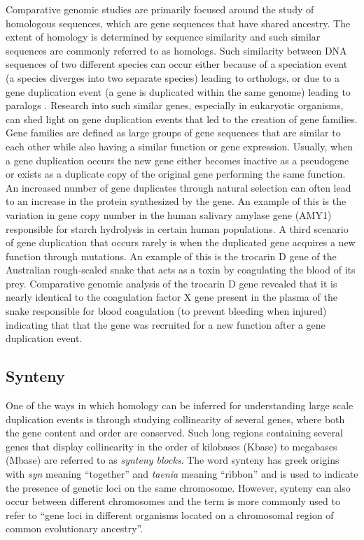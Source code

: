 Comparative genomic studies are primarily focused around the study of homologous sequences, which are gene sequences that have shared ancestry. The extent of homology is determined by sequence similarity and such similar sequences are commonly referred to as homologs. Such similarity between DNA sequences of two different species can occur either because of a speciation event (a species diverges into two separate species) leading to orthologs, or due to a gene duplication event (a gene is duplicated within the same genome) leading to paralogs \cite{jensen2001orthologs}. Research into such similar genes, especially in eukaryotic organisms, can shed light on gene duplication events that led to the creation of gene families\cite{rubin2000comparative}. Gene families are defined as large groups of gene sequences that are similar to each other while also having a similar function or gene expression. Usually, when a gene duplication occurs the new gene either becomes inactive as a pseudogene or exists as a duplicate copy of the original gene performing the same function. An increased number of gene duplicates through natural selection can often lead to an increase in the protein synthesized by the gene. An example of this is the variation in gene copy number in the human salivary amylase gene (AMY1) responsible for starch hydrolysis in certain human populations\cite{perry2007diet}. A third scenario of gene duplication that occurs rarely is when the duplicated gene acquires a new function through mutations. An example of this is the trocarin D gene of the Australian rough-scaled snake that acts as a toxin by coagulating the blood of its prey. Comparative genomic analysis of the trocarin D gene revealed that it is nearly identical to the coagulation factor X gene present in the plasma of the snake responsible for blood coagulation (to prevent bleeding when injured) indicating that that the gene was recruited for a new function after a gene duplication event\cite{reza2007structure}.

\subsection{Synteny}
One of the ways in which homology can be inferred for understanding large scale duplication events is through studying collinearity of several genes, where both the gene content and order are conserved\cite{proost2011adhore}. Such long regions containing several genes that display collinearity in the order of kilobases (Kbase) to megabases (Mbase) are referred to as \textit{synteny blocks}\cite{zeng2008orthocluster}. The word synteny has greek origins with \textit{syn} meaning ``together'' and \textit{taenia} meaning ``ribbon'' and is used to indicate the presence of genetic loci on the same chromosome\cite{renwick1971mapping}. However, synteny can also occur between different chromosomes and the term is more commonly used to refer to ``gene loci in different organisms located on a chromosomal region of common evolutionary ancestry''\cite{passarge1999incorrect}.

